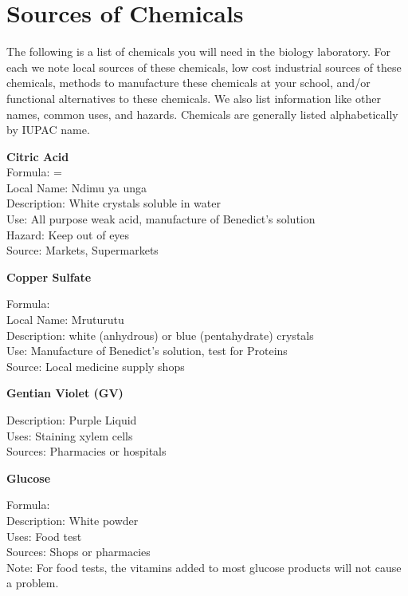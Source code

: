 \chapter{Sources of Chemicals}

The following is a list of chemicals you will need in the biology laboratory. For each we note local sources of these chemicals, low cost industrial sources of
these chemicals, methods to manufacture these chemicals at your school, and/or functional alternatives to these chemicals. We also list information like other names, common uses, and hazards. 
Chemicals are generally listed alphabetically by IUPAC name.

\begin{flushleft}
\textbf{Citric Acid}\\
Formula: =\\
Local Name: Ndimu ya unga\\
Description: White crystals soluble in water\\
Use: All purpose weak acid, manufacture of Benedict's solution\\
Hazard: Keep out of eyes\\
Source: Markets, Supermarkets\\
\end{flushleft}


\begin{flushleft}
\textbf{Copper Sulfate}
\end{flushleft}
\vspace{-10pt}
Formula: \\
Local Name: Mruturutu\\
Description: white (anhydrous) or blue (pentahydrate) crystals\\
Use: Manufacture of Benedict's solution, test for Proteins\\
Source: Local medicine supply shops\\

\begin{flushleft}
\textbf{Gentian Violet (GV)}
\end{flushleft}
\vspace{-10pt}
Description: Purple Liquid\\
Uses: Staining xylem cells\\
Sources: Pharmacies or hospitals\\

\begin{flushleft}
\textbf{Glucose}
\end{flushleft}
\vspace{-10pt}
Formula: \\
Description: White powder\\
Uses: Food test\\
Sources: Shops or pharmacies\\
Note: For food tests, the vitamins added to most glucose products will not cause
a problem.

